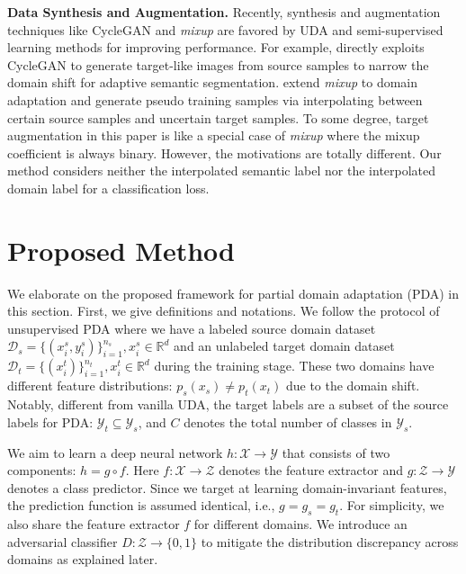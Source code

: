 \documentclass[runningheads]{llncs}
\begin{document}
\textbf{Data Synthesis and Augmentation.}
Recently, synthesis and augmentation techniques like CycleGAN \cite{zhu2017unpaired} and \emph{mixup} \cite{zhang2018mixup} are favored by UDA and semi-supervised learning methods for improving performance.
For example, \cite{hoffman2018cycada} directly exploits CycleGAN to generate target-like images from source samples to narrow the domain shift for adaptive semantic segmentation.
\cite{mao2019virtual,wang2019semi} extend \emph{mixup} to domain adaptation and generate pseudo training samples via interpolating between certain source samples and uncertain target samples.
To some degree, target augmentation in this paper is like a special case of \emph{mixup} where the mixup coefficient is always binary. 
However, the motivations are totally different. Our method considers neither the interpolated semantic label nor the interpolated domain label for a classification loss.

	
\section{Proposed Method}
We elaborate on the proposed framework for partial domain adaptation (PDA) in this section.
First, we give definitions and notations. 
We follow the protocol of unsupervised PDA where we have a labeled source domain dataset $\mathcal{D}_s = \{(x_i^s,y_i^s)\}_{i=1}^{n_s}, x_i^s \in \mathbb{R}^{d}$ and an unlabeled target domain dataset $\mathcal{D}_t = \{(x_i^t)\}_{i=1}^{n_t}, x_i^t \in \mathbb{R}^{d}$ during the training stage.
These two domains have different feature distributions: $p_s(x_s) \not = p_t(x_t)$ due to the domain shift.
Notably, different from vanilla UDA, the target labels are a subset of the source labels for PDA: $\mathcal{Y}_t \subseteq \mathcal{Y}_s$, and $C$ denotes the total number of classes in $\mathcal{Y}_s$.



We aim to learn a deep neural network $h: \mathcal{X}\to \mathcal{Y}$ that consists of two components: $h = g \circ f$. Here $f: \mathcal{X}\to \mathcal{Z}$ denotes the feature extractor and $g: \mathcal{Z}\to \mathcal{Y}$ denotes a class predictor.
Since we target at learning domain-invariant features, the prediction function is assumed identical, i.e., $g=g_s=g_t$.
For simplicity, we also share the feature extractor $f$ for different domains.
We introduce an adversarial classifier $D: \mathcal{Z}\to \{0,1\}$ to mitigate the distribution discrepancy across domains as explained later.
\end{document}
